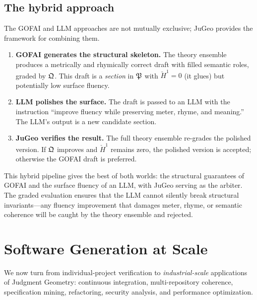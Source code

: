 \section{The hybrid approach}
\label{sec:hybrid}

The GOFAI and LLM approaches are not mutually exclusive; JuGeo
provides the framework for combining them.

\begin{construction}
\label{con:hybrid}
\begin{enumerate}
  \item \textbf{GOFAI generates the structural skeleton.}\;
        The theory ensemble produces a metrically and rhymically
        correct draft with filled semantic roles, graded by
        $\mathfrak{Q}$.  This draft is a \emph{section} in $\mathfrak{P}$ with
        $\check{H}^1 = 0$ (it glues) but potentially low surface
        fluency.
  \item \textbf{LLM polishes the surface.}\;
        The draft is passed to an LLM with the instruction ``improve
        fluency while preserving meter, rhyme, and meaning.''
        The LLM's output is a new candidate section.
  \item \textbf{JuGeo verifies the result.}\;
        The full theory ensemble re-grades the polished version.
        If $\mathfrak{Q}$ improves and $\check{H}^1$ remains zero, the
        polished version is accepted; otherwise the GOFAI draft is
        preferred.
\end{enumerate}
\end{construction}

This hybrid pipeline gives the best of both worlds: the structural
guarantees of GOFAI and the surface fluency of an LLM, with JuGeo
serving as the arbiter.  The graded evaluation ensures that the
LLM cannot silently break structural invariants---any fluency
improvement that damages meter, rhyme, or semantic coherence will
be caught by the theory ensemble and rejected.

\chapter{Software Generation at Scale}
\label{ch:software-scale}

We now turn from individual-project verification to
\emph{industrial-scale} applications of Judgment Geometry:
continuous integration, multi-repository coherence, specification
mining, refactoring, security analysis, and performance optimization.

